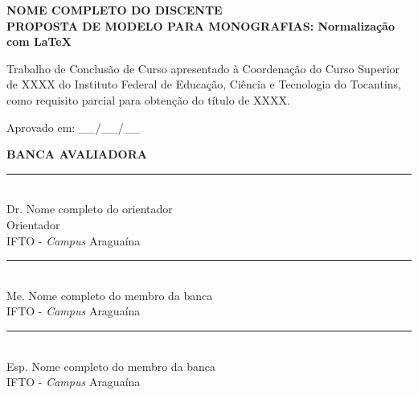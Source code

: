 \newlength{\assinaturalargura}
\setlength{\assinaturalargura}{0.6\textwidth} %

\newcommand{\assinatura}[1]{%
    \begin{center}
        \vspace{1.5cm} %
        \rule{\assinaturalargura}{0.4pt}\\ %
        {\small #1}
    \end{center}
}

\newenvironment{folhadeaprovacao}{%
    \clearpage
    \thispagestyle{empty} %
}{%
    \clearpage
}

\begin{folhadeaprovacao}

\begin{center}

    {\normalsize\textbf{NOME COMPLETO DO DISCENTE}\\}
    \vspace{1cm}
    {\normalsize\bfseries{PROPOSTA DE MODELO PARA MONOGRAFIAS: Normalização com LaTeX\\}}
    \vspace{1cm}
    
    \hspace{.45\linewidth}
    \begin{minipage}{.50\linewidth}
       \singlespacing Trabalho de Conclusão de Curso apresentado à Coordenação do Curso Superior de XXXX do Instituto Federal de Educação, Ciência e Tecnologia do Tocantins, como requisito parcial para obtenção do título de XXXX.
    \end{minipage}

\end{center}

\vspace{0.75cm}
{\normalsize{Aprovado em: \_\_/\_\_/\_\_}}

\vspace{0.75cm}
\begin{center}
    \textbf{BANCA AVALIADORA}
\end{center}

\assinatura{Dr. Nome completo do orientador \\ Orientador \\IFTO - \textit{Campus} Araguaína}
\assinatura{Me. Nome completo do membro da banca\\IFTO - \textit{Campus} Araguaína}
\assinatura{Esp. Nome completo do membro da banca \\IFTO - \textit{Campus} Araguaína}

\end{folhadeaprovacao}